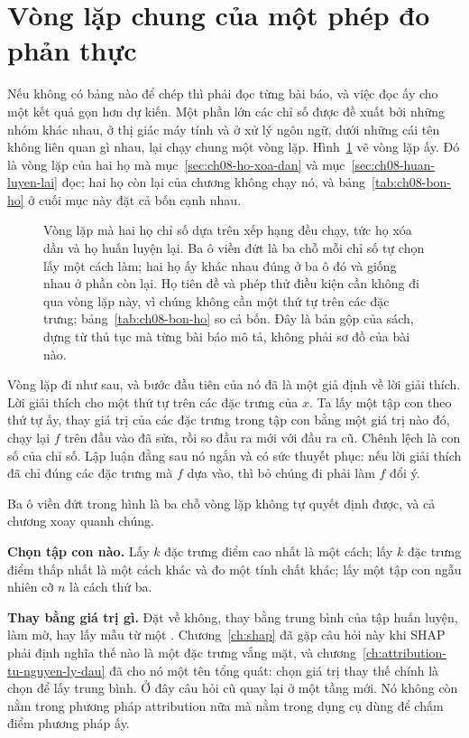\section{Vòng lặp chung của một phép đo phản thực}
\label{sec:ch08-vong-lap-chung}

%
%
Nếu không có bảng nào để chép thì phải đọc từng bài báo, và việc đọc ấy cho một
kết quả gọn hơn dự kiến. Một phần lớn các chỉ số được đề xuất bởi những nhóm khác
nhau, ở thị giác máy tính và ở xử lý ngôn ngữ, dưới những cái tên không liên
quan gì nhau, lại chạy chung một vòng lặp. Hình~\ref{fig:ch08-vong-lap-do} vẽ vòng lặp ấy.
Đó là vòng lặp của hai họ mà mục~\ref{sec:ch08-ho-xoa-dan} và
mục~\ref{sec:ch08-huan-luyen-lai} đọc; hai họ còn lại của chương không chạy nó,
và bảng~\ref{tab:ch08-bon-ho} ở cuối mục này đặt cả bốn cạnh nhau.

\begin{figure}[htbp]
  \centering
  
  \caption{Vòng lặp mà hai họ chỉ số dựa trên xếp hạng đều chạy, tức họ xóa dần
  và họ huấn luyện lại. Ba ô viền đứt là
  ba chỗ mỗi chỉ số tự chọn lấy một cách làm; hai họ ấy khác
  nhau đúng ở ba ô đó và giống nhau ở phần còn lại. Họ tiên đề và phép thử điều
  kiện cần không đi qua vòng lặp này, vì chúng không cần một thứ tự trên các đặc
  trưng; bảng~\ref{tab:ch08-bon-ho} so cả bốn. Đây là bản gộp của sách,
  dựng từ thủ tục mà từng bài báo mô tả, không phải sơ đồ của bài nào.}
  \label{fig:ch08-vong-lap-do}
\end{figure}

Vòng lặp đi như sau, và bước đầu tiên của nó đã là một giả định về lời giải
thích. Lời giải thích cho một thứ tự trên các đặc trưng của $x$.
Ta lấy một tập con theo thứ tự ấy, thay giá trị của các đặc trưng trong tập con
bằng một giá trị nào đó, chạy lại $f$ trên đầu vào đã sửa, rồi so đầu ra mới với
đầu ra cũ. Chênh lệch là con số của chỉ số. Lập luận đằng sau nó ngắn và có sức
thuyết phục: nếu lời giải thích đã chỉ đúng các đặc trưng mà $f$ dựa vào, thì bỏ
chúng đi phải làm $f$ đổi ý.

Ba ô viền đứt trong hình là ba chỗ vòng lặp không tự quyết định được, và cả
chương xoay quanh chúng.

\textbf{Chọn tập con nào.} Lấy $k$ đặc trưng điểm cao nhất là một cách; lấy $k$
đặc trưng điểm thấp nhất là một cách khác và đo một tính chất khác; lấy một tập
con ngẫu nhiên cỡ $n$ là cách thứ ba.

\textbf{Thay bằng giá trị gì.} Đặt về không, thay bằng trung bình của tập huấn
luyện, làm mờ, hay lấy mẫu từ một . Chương~\ref{ch:shap} đã gặp câu
hỏi này khi SHAP phải định nghĩa thế nào là một đặc trưng vắng mặt, và
chương~\ref{ch:attribution-tu-nguyen-ly-dau} đã cho nó một tên tổng quát: chọn
giá trị thay thế chính là chọn  để lấy trung bình. Ở đây
câu hỏi cũ quay
lại ở một tầng mới. Nó không còn nằm trong phương pháp attribution nữa mà nằm
trong dụng cụ dùng để chấm điểm phương pháp ấy.

